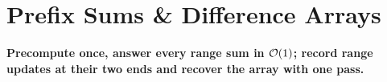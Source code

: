 \chapter{Prefix Sums \& Difference Arrays}
\label{ch:prefix_sums}

\begin{tcolorbox}[enhanced, colback=white, colframe=secondaryblue, boxrule=1pt, arc=2mm]
\textbf{\large\textcolor{primaryblue}{Precompute once, answer every range sum in $\mathcal{O}(1)$; record range updates at their two ends and recover the array with one pass.}}
\end{tcolorbox}


